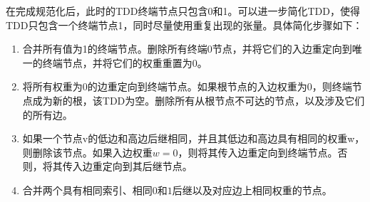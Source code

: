 在完成规范化后，此时的TDD终端节点只包含0和1。可以进一步简化TDD，使得TDD只包含一个终端节点1，同时尽量使用重复出现的张量。具体简化步骤如下：
\begin{enumerate}
    \item 	合并所有值为1的终端节点。删除所有终端$0$节点，并将它们的入边重定向到唯一的终端节点，并将它们的权重重置为$0$。\label{sympl1}
	\item 将所有权重为$0$的边重定向到终端节点。如果根节点的入边权重为$0$，则终端节点成为新的根，该TDD为空。删除所有从根节点不可达的节点，以及涉及它们的所有边。\label{sympl2}
	\item 如果一个节点v的低边和高边后继相同，并且其低边和高边具有相同的权重w，则删除该节点。如果入边权重$w=0$，则将其传入边重定向到终端节点。否则，将其传入边重定向到其后继节点。\label{sympl3}
	\item 合并两个具有相同索引、相同$0$和$1$后继以及对应边上相同权重的节点。\label{sympl4}
\end{enumerate}

